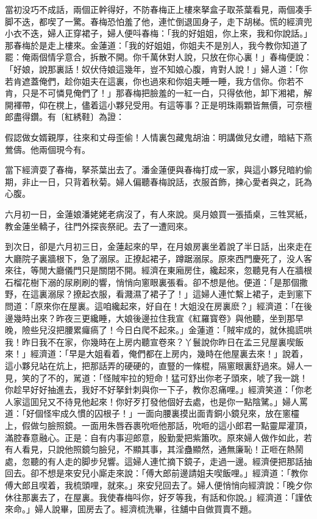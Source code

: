 當初没巧不成話，兩個正幹得好，不防春梅正上樓來拏盒子取茶葉看見，兩個凑手脚不迭，都喫了一驚。春梅恐怕羞了他，連忙倒退囬身子，走下胡梯。慌的經濟兜小衣不迭，婦人正穿裙子，婦人便呌春梅：「我的好姐姐，你上來，我和你說話。」那春梅於是走上樓來。金蓮道：「我的好姐姐，你姐夫不是別人，我今教你知道了罷：俺兩個情孚意合，拆散不開。你千萬休對人說，只放在你心裏！」春梅便說：「好娘，說那裏話！奴伏侍娘這幾年，豈不知娘心腹，肯對人說！」婦人道：「你若肯遮蓋俺們，趁你姐夫在這裏，你也過來和你姐夫睡一睡，我方信你。你若不肯，只是不可憐見俺們了！」那春梅把臉羞的一紅一白，只得依他，卸下湘裙，解開褌帶，仰在櫈上，儘着這小夥兒受用。有這等事？正是明珠兩顆皆無價，可奈檀郎盡得鑽。有〔紅綉鞋〕為證：

\begin{myquote}
假認做女婿親厚，往來和丈母歪偷！人情裏包藏鬼胡油：明講做兒女禮，暗結下燕鶯儔。他兩個現今有。
\end{myquote}

當下經濟耍了春梅，拏茶葉出去了。潘金蓮便與春梅打成一家，與這小夥兒暗約偷期，非止一日，只背着秋菊。婦人偏聽春梅說話，衣服首飾，揀心愛者與之，託為心腹。

六月初一日，金蓮娘潘姥姥老病沒了，有人來說。吳月娘買一張插桌，三牲冥紙，教金蓮坐轎子，往門外探丧祭祀。去了一遭囘來。

到次日，卻是六月初三日，金蓮起來的早，在月娘房裏坐着說了半日話，出來走在大廳院子裏牆根下，急了溺尿。正撩起裙子，蹲踞溺尿。原來西門慶死了，没人客來往，等閒大廳儀門只是關閉不開。經濟在東廂房住，纔起來，忽聽見有人在牆根石榴花樹下溺的尿刷刷的響，悄悄向窻眼裏張看。卻不想是他。便道：「是那個撒野，在這裏溺尿？撩起衣服，看濺濕了裙子了！」這婦人連忙繫上裙子，走到窻下問道：「原來你在屋裏。這咱纔起來，好自在！大姐没在房裏麽？」經濟道：「在後邊幾時出來？昨夜三更纔睡，大娘後邊拉住我宣《紅羅寳卷》與他聽，坐到那早晚，險些兒沒把腰累㿚瘑了！今日白爬不起來。」金蓮道：「賊牢成的，就休搗謊哄我！昨日我不在家，你幾時在上房内聽宣卷來？丫鬟說你昨日在孟三兒屋裏喫飯來！」經濟道：「早是大姐看着，俺們都在上房内，幾時在他屋裏去來！」說着，這小夥兒站在炕上，把那話弄的硬硬的，直豎的一條棍，隔窻眼裏舒過來。婦人一見，笑的了不的，駡道：「怪賊牢拉的短命！猛可舒出你老子頭來，唬了我一跳！你趁早好好抽進去，我好不好拏針刺與你一下子，教你忍痛哩。」經濟笑道：「你老人家這囬兒又不待見他起來！你好歹打發他個好去處，也是你一點陰騭。」婦人罵道：「好個怪牢成久慣的囚根子！」一面向腰裏摸出面青銅小鏡兒來，放在窻欞上，假做匀臉照鏡。一面用朱唇吞裹吮咂他那話，吮咂的這小郎君一點靈犀灌頂，滿腔春意融心。正是：自有内事迎郎意，殷勤愛把紫簫吹。原來婦人做作如此，若有人看見，只說他照鏡匀臉兒，不顯其事，其淫蠱顯然，通無廉恥！正咂在熱鬧處，忽聽的有人走的脚步兒響。這婦人連忙摘下鏡子，走過一邊。經濟便把那話抽回去。卻不想是來安兒小廝走來說：「傅大郎前邊請姐夫喫飯哩。」經濟道：「教你傅大郎且喫着，我梳頭哩，就來。」來安兒回去了。婦人便悄悄向經濟說：「晚夕你休往那裏去了，在屋裏。我使春梅呌你，好歹等我，有話和你說。」經濟道：「謹依來命。」婦人說畢，囬房去了。經濟梳洗畢，往舖中自做買賣不題。

